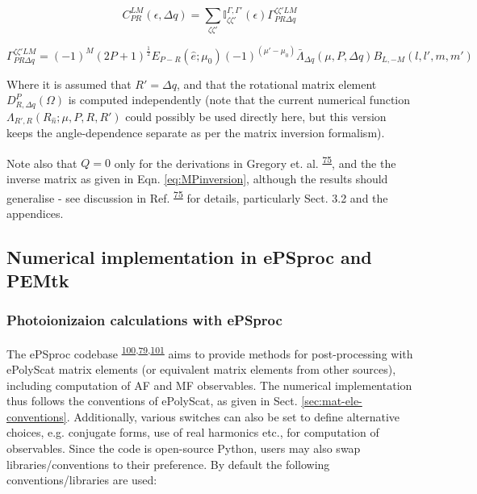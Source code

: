 \documentclass[10pt]{article}
\begin{document}
\begin{equation}
C_{PR}^{LM}(\epsilon,\Delta q)=\sum_{\zeta\zeta'}\mathbb{I}_{\zeta\zeta'}^{\Gamma,\Gamma'}(\epsilon)\Gamma_{PR\Delta q}^{\zeta\zeta'LM}
\end{equation}

\begin{equation}
\Gamma_{PR\Delta q}^{\zeta\zeta'LM}=(-1)^{M}(2P+1)^{\frac{1}{2}}E_{P-R}(\hat{e};\mu_{0})(-1)^{(\mu'-\mu_{0})}\bar{\Lambda}_{\Delta q}(\mu,P,\Delta q)B_{L,-M}(l,l',m,m')
\end{equation}

Where it is assumed that $R'=\Delta q$, and that the rotational matrix element $D_{R,\Delta q}^{P}(\Omega)$
is computed independently (note that the current numerical function $\Lambda_{R',R}(R_{\hat{n}};\mu,P,R,R')$
could possibly be used directly here, but this version keeps the angle-dependence
separate as per the matrix inversion formalism).

Note also that $Q=0$ only for the derivations in Gregory et. al. \textsuperscript{\hyperref[csl:75]{75}}, and the the inverse matrix as given in Eqn. \ref{eq:MPinversion}, although the results should generalise - see discussion in Ref. \textsuperscript{\hyperref[csl:75]{75}} for details, particularly Sect. 3.2 and the appendices.

\subsection{Numerical implementation in ePSproc and PEMtk\label{sec:numerical-notes}}

\subsubsection{Photoionizaion calculations with ePSproc}

The ePSproc codebase \textsuperscript{\hyperref[csl:100]{100},\hyperref[csl:79]{79},\hyperref[csl:101]{101}} aims to provide methods for post-processing with ePolyScat matrix elements (or equivalent matrix elements from other sources), including computation of AF and MF observables. The numerical implementation thus follows the conventions of ePolyScat, as given in Sect. \ref{sec:mat-ele-conventions}. Additionally, various switches can also be set to define alternative choices, e.g. conjugate forms, use of real harmonics etc., for computation of observables. Since the code is open-source Python, users may also swap libraries/conventions to their preference. By default the following conventions/libraries are used:
\end{document}
